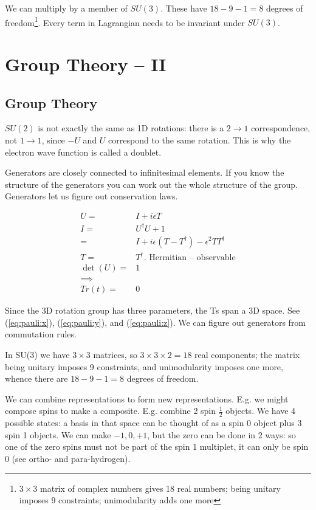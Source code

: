 \documentclass[]{article}
\begin{document}
We can multiply by a member of $SU(3)$. These have $18-9-1=8$ degrees of freedom\footnote{$3\times 3$ matrix of complex numbers gives 18 real numbers; being unitary imposes 9 constraints; unimodularity adds one more}. Every term in Lagrangian needs to be invariant under $SU(3)$.  


\section{Group Theory – II}

\subsection{Group Theory}
$SU(2)$ is not exactly the same as 1D rotations: there is a $2\rightarrow1$ correspondence, not  $1\rightarrow1$, since $-U$ and $U$ correspond to the same rotation. This is why the electron wave function is called a doublet.

Generators are closely connected to infinitesimal elements. If you know the structure of the generators you can work out the whole structure of the group. Generators let us figure out conservation laws.

\begin{align*}
	U =& I + i \epsilon T\\
	I =& U^\dagger U + 1\\
	=& I + i\epsilon(T - T^\dagger) - \epsilon^2 T T^\dagger\\
	T =& T^\dagger \text{. Hermitian -- observable}\\
	\det(U) =& 1\\
	\implies&\\
	Tr(t)=&0
\end{align*}

Since the 3D rotation group has three parameters, the Ts span a 3D space. See (\ref{eq:pauli:x}), (\ref{eq:pauli:y}), and (\ref{eq:pauli:z}). We can figure out generators from commutation rules.

In SU(3) we have $3\times3$ matrices, so $3\times3\times2=18$ real components; the matrix being unitary imposes 9 constraints, and unimodularity imposes one more, whence there are $18-9-1=8$ degrees of freedom.

We can combine representations to form new representations. E.g. we might compose spins to make a composite. E.g. combine 2 spin $\frac{1}{2}$ objects. We have 4 possible states: a basis in that space can be thought of as a spin 0 object plus 3 spin 1 objects. We can make ${-1,0,+1}$, but the zero can be done in 2 ways: so one of the zero spins must not be part of the spin 1 multiplet, it can only be spin 0 (see ortho- and para-hydrogen).
\end{document}
